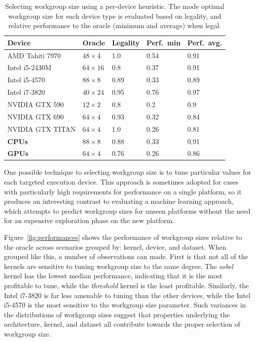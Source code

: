 \documentclass[nonatbib,preprint,9pt]{sigplanconf}
\begin{document}
\begin{table}
  \scriptsize
  \centering
  \begin{tabular}{lllp{.9cm}p{.9cm}}
    \toprule
    Device &         Oracle & Legality & Perf.\ min & Perf.\ avg. \\
    \midrule
    AMD Tahiti 7970 &   $48\times 4$ &      1.0 &       0.54 &        0.91 \\
    Intel i5-2430M &  $64\times 16$ &      0.8 &       0.37 &        0.91 \\
    Intel i5-4570 &   $88\times 8$ &     0.89 &       0.33 &        0.89 \\
    Intel i7-3820 &  $40\times 24$ &     0.95 &       0.76 &        0.97 \\
    NVIDIA GTX 590 &  $12\times 2$ &      0.8 &        0.2 &         0.9 \\
    NVIDIA GTX 690 &   $64\times 4$ &     0.93 &       0.32 &        0.84 \\
    NVIDIA GTX TITAN &   $64\times 4$ &      1.0 &       0.26 &        0.81 \\
    \textbf{CPUs} &   $88\times 8$ &     0.88 &       0.33 &        0.91 \\
    \textbf{GPUs} &   $64\times 4$ &     0.76 &       0.26 &        0.86 \\
    \bottomrule
  \end{tabular}
  \caption[Performance of tuning with a per-device heuristic]{%
    Selecting workgroup size using a per-device heuristic. The mode
    optimal workgroup size for each device type is evaluated
    based on legality, and relative performance to the oracle (minimum
    and average) when legal.%
  }
  \label{tab:heuristic-dev}
\end{table}

One possible technique to selecting workgroup size is to tune
particular values for each targeted execution device. This approach is
sometimes adopted for cases with particularly high requirements for
performance on a single platform, so it produces an interesting
contrast to evaluating a machine learning approach, which attempts to
predict workgroup sizes for unseen platforms without the need for an
expensive exploration phase on the new platform.

Figure~\ref{fig:performances} shows the performance of workgroup sizes
relative to the oracle across scenarios grouped by: kernel, device,
and dataset. When grouped like this, a number of observations can
made. First is that not all of the kernels are sensitive to tuning
workgroup size to the same degree. The \emph{sobel} kernel has the
lowest median performance, indicating that it is the most profitable
to tune, while the \emph{threshold} kernel is the least
profitable. Similarly, the Intel i7-3820 is far less amenable to
tuning than the other devices, while the Intel i5-4570 is the most
sensitive to the workgroup size parameter. Such variances in the
distributions of workgroup sizes suggest that properties underlying
the architecture, kernel, and dataset all contribute towards the
proper selection of workgroup size.
\end{document}
